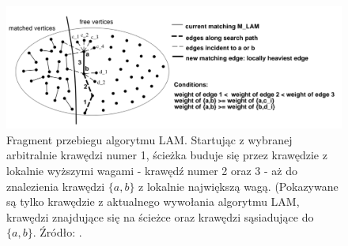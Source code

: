 \begin{figure}[h]
    \centering
    \includegraphics[width=0.9\linewidth]{images/lam}
    \caption{Fragment przebiegu algorytmu LAM. Startując z wybranej arbitralnie krawędzi numer 1, ścieżka buduje się
    przez krawędzie z lokalnie wyższymi wagami - krawędź numer 2 oraz 3 -
    aż do znalezienia krawędzi \(\{a, b\}\) z lokalnie największą wagą. (Pokazywane są tylko krawędzie z aktualnego
    wywołania algorytmu LAM, krawędzi znajdujące się na ścieżce oraz krawędzi sąsiadujące do \(\{a, b\}\).
    Źródło: \cite{weighted_maching}.}
    \label{im:lam}
\end{figure}

